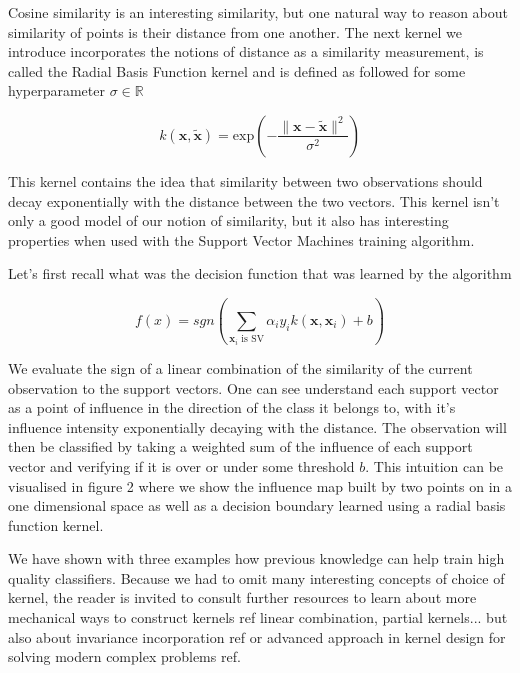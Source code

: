 Cosine similarity is an interesting similarity, but one natural way to reason about similarity of points is their distance from one another. The next kernel we introduce incorporates the notions of distance as a similarity measurement, is called the Radial Basis Function kernel and is defined as followed for some hyperparameter $\sigma \in \mathbb{R}$

\begin{equation*}
  k(\mathbf{x}, \mathbf{\tilde{x}}) = \text{exp}\left(-\frac{\|\mathbf{x} - \mathbf{\tilde{x}}\|^2}{\sigma^2}\right)
\end{equation*}

This kernel contains the idea that similarity between two observations should decay exponentially with the distance between the two vectors. This kernel isn't only a good model of our notion of similarity, but it also has interesting properties when used with the Support Vector Machines training algorithm.

Let's first recall what was the decision function that was learned by the algorithm

\begin{equation*}
  f\left(x\right) = sgn\left(\sum_{\mathbf{x}_i \text{ is SV}}\alpha_iy_ik\left(\mathbf{x}, \mathbf{x}_i\right) + b\right)
\end{equation*}

We evaluate the sign of a linear combination of the similarity of the current observation to the support vectors. One can see understand each support vector as a point of influence in the direction of the class it belongs to, with it's influence intensity exponentially decaying with the distance. The observation will then be classified by taking a weighted sum of the influence of each support vector and verifying if it is over or under some threshold $b$. This intuition can be visualised in figure 2 where we show the influence map built by two points on in a one dimensional space as well as a decision boundary learned using a radial basis function kernel.

We have shown with three examples how previous knowledge can help train high quality classifiers. Because we had to omit many interesting concepts of choice of kernel, the reader is invited to consult further resources to learn about more mechanical ways to construct kernels \textcolor[rgb]{1,0,0}{ref linear combination, partial kernels...} but also about invariance incorporation \textcolor[rgb]{1,0,0}{ref} or advanced approach in kernel design for solving modern complex problems \textcolor[rgb]{1,0,0}{ref}.

